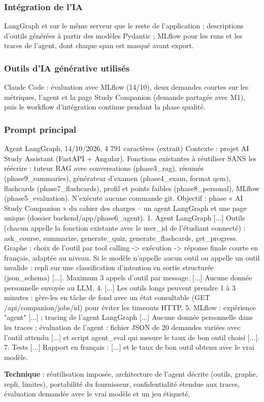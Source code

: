 \documentclass[12pt,a4paper]{report}
\DeclareRobustCommand{\code}[1]{\texttt{\codecasse{#1}}}
\begin{document}
\subsubsection{Intégration de l'IA}
LangGraph et \code{ChatOpenAI} sur le même serveur que le reste de l'application ; descriptions d'outils
générées à partir des modèles Pydantic ; MLflow pour les runs et les traces de l'agent, dont chaque span
est masqué avant export.

\subsubsection{Outils d'IA générative utilisés}
Claude Code : évaluation avec MLflow (14/10), deux demandes courtes sur les métriques, l'agent et la page
Study Companion (demande partagée avec M1), puis le workflow d'intégration continue pendant la phase
qualité.

\subsubsection{Prompt principal}
\begin{prompt}{Agent LangGraph, 14/10/2026, 4 791 caractères (extrait)}
Contexte : projet AI Study Assistant (FastAPI + Angular). Fonctions existantes à réutiliser SANS
les réécrire : tuteur RAG avec conversations (phase3_rag), résumés (phase9_summaries), générateur
d'examen (phase4_exam, format qcm), flashcards (phase7_flashcards), profil et points faibles
(phase8_personal), MLflow (phase5_evaluation). N'exécute aucune commande git.
Objectif : phase « AI Study Companion » du cahier des charges -- un agent LangGraph et une page
unique (dossier backend/app/phase6_agent).
1. Agent LangGraph [...] Outils (chacun appelle la fonction existante avec le user_id de
   l'étudiant connecté) : ask_course, summarize, generate_quiz, generate_flashcards, get_progress.
   Graphe : choix de l'outil par tool calling -> exécution -> réponse finale courte en français,
   adaptée au niveau. Si le modèle n'appelle aucun outil ou appelle un outil invalide : repli sur
   une classification d'intention en sortie structurée (json_schema) [...]. Maximum 3 appels
   d'outil par message. [...] Aucune donnée personnelle envoyée au LLM.
4. [...] Les outils longs peuvent prendre 1 à 3 minutes : gère-les en tâche de fond avec un état
   consultable (GET /api/companion/jobs/{id}) pour éviter les timeouts HTTP.
5. MLflow : expérience "agent" [...] ; tracing de l'agent LangGraph [...] Aucune donnée personnelle
   dans les traces ; évaluation de l'agent : fichier JSON de 20 demandes variées avec l'outil
   attendu [...] et script agent_eval qui mesure le taux de bon outil choisi [...].
7. Tests [...] Rapport en français : [...] et le taux de bon outil obtenu avec le vrai modèle.
\end{prompt}
\textbf{Technique} : réutilisation imposée, architecture de l'agent décrite (outils, graphe, repli,
limites), portabilité du fournisseur, confidentialité étendue aux traces, évaluation demandée avec le vrai
modèle et un jeu étiqueté.
\end{document}
